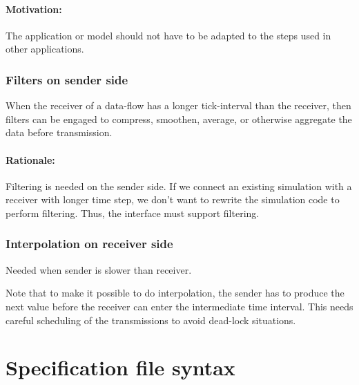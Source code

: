 \documentclass[a4paper]{report}
\newenvironment{rationale}%
{\par\paragraph{Rationale:}}%
{\par}
\begin{document}
\paragraph{Motivation:} The application or model should not have to be
adapted to the steps used in other applications.


\subsubsection{Filters on sender side}

When the receiver of a data-flow has a longer tick-interval than the
receiver, then filters can be engaged to compress, smoothen, average,
or otherwise aggregate the data before transmission.

\begin{rationale}
  Filtering is needed on the sender side.  If we connect an existing
  simulation with a receiver with longer time step, we don't want to
  rewrite the simulation code to perform filtering.  Thus, the
  interface must support filtering.
\end{rationale}


\subsubsection{Interpolation on receiver side}

Needed when sender is slower than receiver.

Note that to make it possible to do interpolation, the sender has to
produce the next value before the receiver can enter the intermediate
time interval.  This needs careful scheduling of the transmissions to
avoid dead-lock situations.

\section{Specification file syntax}

\newcommand{\nt}[1]{$<$#1$>$}
\end{document}
